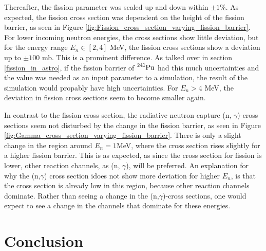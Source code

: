 \documentclass[]{article}
\begin{document}
 \par 
 \vspace{3mm}
 \noindent Thereafter, the fission parameter was scaled up and down within $\pm 1 \%$. As expected, the fission cross section was dependent on the height of the fission barrier, as seen in Figure \ref{fig:Fission_cross_section_varying_fission_barrier}. For lower incoming neutron energies, the cross sections show little deviation, but for the energy range $E_n \in [2,4]$ MeV, the fission cross sections show a deviation up to $\pm 100$ mb. This is a prominent difference. As talked over in section \ref{fission_in_astro}, if the fission barrier of $\ce{^{241}Pu}$ had this much uncertainties and the value was needed as an input parameter to a simulation, the result of the simulation would propably have high uncertainties. For $E_n > 4$ MeV, the deviation in fission cross sections seem to become smaller again.
 
 \par 
 \vspace{3mm}
 \noindent In contrast to the fission cross section, the radiative neutron capture (n, $\gamma$)-cross sections seem not disturbed by the change in the fission barrier, as seen in Figure \ref{fig:Gamma_cross_section_varying_fission_barrier}. There is only a slight change in the region around $E_n = 1$MeV, where the cross section rises slightly for a higher fission barrier. This is as expected, as since the cross section for fission is lower, other reaction channels, as (n, $\gamma$), will be preferred. An explanation for why the (n,$\gamma$) cross section idoes not show more deviation for higher $E_n$, is that the cross section is already low in this region, because other reaction channels dominate. Rather than seeing a change in the (n,$\gamma$)-cross sections, one would expect to see a change in the channels that dominate for these energies. 


\section{Conclusion}



 
\end{document}
